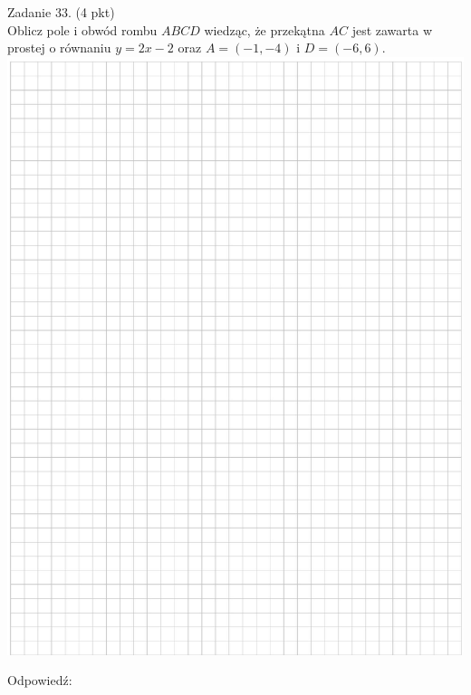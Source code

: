 \documentclass[10pt]{article}
\begin{document}
Zadanie 33. (4 pkt)\\
Oblicz pole i obwód rombu \(A B C D\) wiedząc, że przekątna \(A C\) jest zawarta w prostej o równaniu \(y=2 x-2\) oraz \(A=(-1,-4)\) i \(D=(-6,6)\).\\
\includegraphics[max width=\textwidth, center]{2024_11_21_9a9f600c3b3af5013d80g-14}

Odpowiedź:
\end{document}
